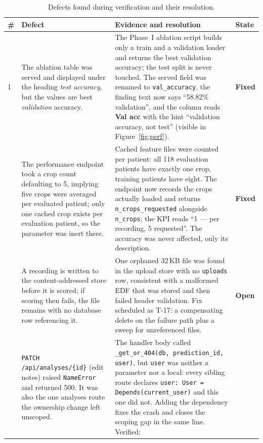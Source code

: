\documentclass[11pt,a4paper]{article}
\newcommand{\code}[1]{\texttt{#1}}
\newcommand{\stFixed}{\textcolor{okgreen}{\textbf{Fixed}}}
\newcommand{\stOpen}{\textcolor{warnamber}{\textbf{Open}}}
\begin{document}
\begin{table}[H]\centering\caption{Defects found during verification and their resolution.}
\label{tab:def}\scriptsize\renewcommand{\arraystretch}{1.15}
\begin{tabularx}{\linewidth}{@{}C{0.5cm} L{3.0cm} Y C{1.1cm}@{}}
\toprule
\textbf{\#} & \textbf{Defect} & \textbf{Evidence and resolution} & \textbf{State} \\
 & The ablation table was served and displayed under the heading \emph{test
accuracy}, but the values are best \emph{validation} accuracy.
& The Phase~I ablation script builds only a train and a validation loader and
returns the best validation accuracy; the test split is never touched. The
served field was renamed to \code{val\_accuracy}, the finding text now says
``58.82\% validation'', and the column reads \textbf{Val acc} with the hint
``validation accuracy, not test'' (visible in Figure~\ref{fig:perf}).
& \stFixed \\
 & The performance endpoint took a crop count defaulting to 5, implying five
crops were averaged per evaluated patient; only one cached crop exists per
evaluation patient, so the parameter was inert there.
& Cached feature files were counted per patient: all 118 evaluation patients
have exactly one crop, training patients have eight. The endpoint now records
the crops actually loaded and returns \code{n\_crops\_requested} alongside
\code{n\_crops}; the KPI reads ``1 --- per recording, 5 requested''. The
accuracy was never affected, only its description.
& \stFixed \\
 & A recording is written to the content-addressed store before it is scored;
if scoring then fails, the file remains with no database row referencing it.
& One orphaned 32\,KB file was found in the upload store with no \code{uploads}
row, consistent with a malformed EDF that was stored and then failed header
validation. Fix scheduled as T-17: a compensating delete on the failure path
plus a sweep for unreferenced files.
& \stOpen \\
 & \code{PATCH /api/analyses/\{id\}} (edit notes) raised \code{NameError} and
returned 500. It was also the one analyses route the ownership change left
unscoped.
& The handler body called \code{\_get\_or\_404(db, prediction\_id, user)}, but
\code{user} was neither a parameter nor a local: every sibling route declares
\code{user: User = Depends(current\_user)} and this one did not. Adding the
dependency fixes the crash and closes the scoping gap in the same line. Verified:

\end{tabularx}
\end{table}
\end{document}
